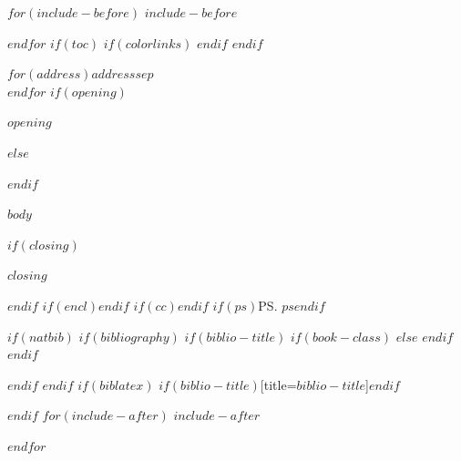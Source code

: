 \documentclass[version=last,$if(fontsize)$$fontsize$$else$12pt$endif$,{"$if(lco)$$lco$$else$$lco_default$$endif$"},$if(lang)$$babel-lang$,$endif$$if(address)$$else$addrfield=false,$endif$$if(papersize)$paper=$papersize$,$endif$$for(classoption)$$classoption$$sep$,$endfor$]{scrlttr2}
\begin{document}
$for(include-before)$
$include-before$

$endfor$
$if(toc)$
{
$if(colorlinks)$
\hypersetup{linkcolor=$if(toccolor)$$toccolor$$else$black$endif$}
$endif$
\setcounter{tocdepth}{$toc-depth$}
\tableofcontents
}
$endif$

\begin{letter}{$for(address)$$address$$sep$\\$endfor$}
$if(opening)$\opening{$opening$}$else$\opening{}$endif$

$body$

$if(closing)$\closing{$closing$}$endif$
$if(encl)$$endif$
$if(cc)$$endif$
$if(ps)$\ps{$ps$}$endif$

\end{letter}

$if(natbib)$
$if(bibliography)$
$if(biblio-title)$
$if(book-class)$
\renewcommand\bibname{$biblio-title$}
$else$
\renewcommand\refname{$biblio-title$}
$endif$
$endif$


$endif$
$endif$
$if(biblatex)$
\printbibliography$if(biblio-title)$[title=$biblio-title$]$endif$

$endif$
$for(include-after)$
$include-after$

$endfor$
\end{document}
